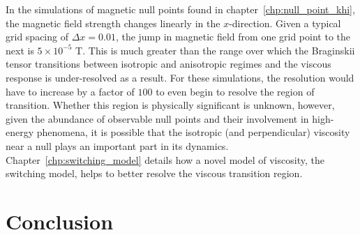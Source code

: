 In the simulations of magnetic null points found in chapter~\ref{chp:null_point_khi}, the magnetic field strength changes linearly in the $x$-direction. Given a typical grid spacing of $\Delta x = 0.01$, the jump in magnetic field from one grid point to the next is $5\times 10^{-5}$ T. This is much greater than the range over which the Braginskii tensor transitions between isotropic and anisotropic regimes and the viscous response is under-resolved as a result. For these simulations, the resolution would have to increase by a factor of $100$ to even begin to resolve the region of transition. Whether this region is physically significant is unknown, however, given the abundance of observable null points and their involvement in high-energy phenomena, it is possible that the isotropic (and perpendicular) viscosity near a null plays an important part in its dynamics. Chapter~\ref{chp:switching_model} details how a novel model of viscosity, the switching model, helps to better resolve the viscous transition region.

\section{Conclusion}

